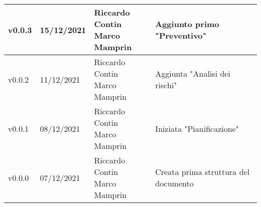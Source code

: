 \begin{center}
\begin{longtable}{|p{2cm}|p{2cm}|p{4cm}|p{5cm}|}
    v0.0.3            & 15/12/2021    & \aCapo{Riccardo Contin\\Marco Mamprin}                & Aggiunto primo "Preventivo" \\ \hline
    v0.0.2            & 11/12/2021    & \aCapo{Riccardo Contin\\Marco Mamprin}                & Aggiunta "Analisi dei rischi" \\ \hline
    v0.0.1            & 08/12/2021    & \aCapo{Riccardo Contin\\Marco Mamprin}                & Iniziata "Pianificazione" \\ \hline
    v0.0.0            & 07/12/2021    & \aCapo{Riccardo Contin\\Marco Mamprin}                & Creata prima struttura del documento \\ \hline
  \end{longtable}
\end{center}
